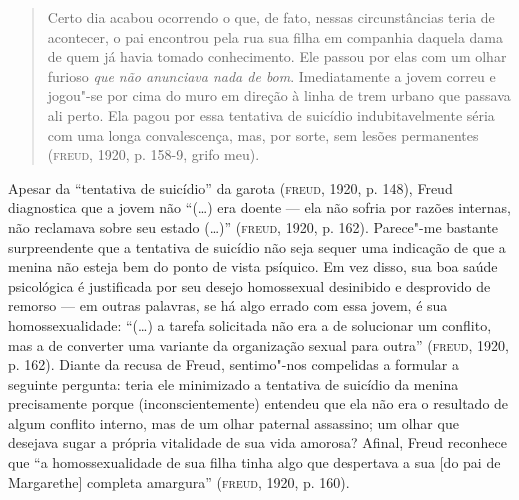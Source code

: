 \begin{quote}
Certo dia acabou ocorrendo o que, de fato, nessas circunstâncias teria
de acontecer, o pai encontrou pela rua sua filha em companhia daquela
dama de quem já havia tomado conhecimento. Ele passou por elas com um
olhar furioso \emph{que não anunciava nada de bom}. Imediatamente a
jovem correu e jogou"-se por cima do muro em direção à linha de trem
urbano que passava ali perto. Ela pagou por essa tentativa de suicídio
indubitavelmente séria com uma longa convalescença, mas, por sorte, sem
lesões permanentes (\textsc{freud}, 1920, p. 158-9, grifo meu).
\end{quote}

Apesar da ``tentativa de suicídio'' da garota (\textsc{freud}, 1920, p. 148),
Freud diagnostica que a jovem não ``(\ldots{}) era doente --- ela não
sofria por razões internas, não reclamava sobre seu estado (\ldots{})''
(\textsc{freud}, 1920, p. 162). Parece"-me bastante surpreendente que a tentativa
de suicídio não seja sequer uma indicação de que a menina não esteja bem
do ponto de vista psíquico. Em vez disso, sua boa saúde psicológica é
justificada por seu desejo homossexual desinibido e desprovido de
remorso --- em outras palavras, se há algo errado com essa jovem, é sua
homossexualidade: ``(\ldots{}) a tarefa solicitada não era a de
solucionar um conflito, mas a de converter uma variante da organização
sexual para outra'' (\textsc{freud}, 1920, p. 162). Diante da recusa de Freud,
sentimo"-nos compelidas a formular a seguinte pergunta: teria ele
minimizado a tentativa de suicídio da menina precisamente porque
(inconscientemente) entendeu que ela não era o resultado de algum
conflito interno, mas de um olhar paternal assassino; um olhar que
desejava sugar a própria vitalidade de sua vida amorosa? Afinal, Freud
reconhece que ``a homossexualidade de sua filha tinha algo que
despertava a sua {[}do pai de Margarethe{]} completa amargura'' (\textsc{freud},
1920, p. 160).

